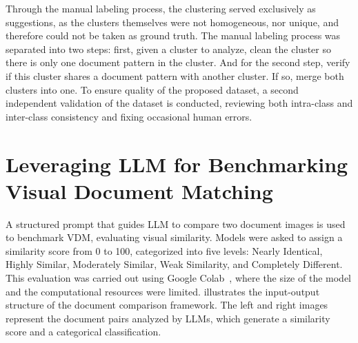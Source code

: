 Through the manual labeling process, the clustering served exclusively as suggestions, as the clusters themselves were not homogeneous, nor unique, and therefore could not be taken as ground truth. The manual labeling process was separated into two steps: first, given a cluster to analyze, clean the cluster so there is only one document pattern in the cluster. And for the second step, verify if this cluster shares a document pattern with another cluster. If so, merge both clusters into one. To ensure quality of the proposed dataset, a second independent validation of the dataset is conducted, reviewing both intra-class and inter-class consistency and fixing occasional human errors.

\section{Leveraging LLM for Benchmarking Visual Document Matching}
\label{sec:method_benchmark}

A structured prompt that guides \gls{LLM} to compare two document images is used to benchmark \gls{VDM}, evaluating visual similarity. Models were asked to assign a similarity score from 0 to 100, categorized into five levels: Nearly Identical, Highly Similar, Moderately Similar, Weak Similarity, and Completely Different. This evaluation was carried out using Google Colab~\cite{research_google_2024}, where the size of the model and the computational resources were limited.  illustrates the input-output structure of the document comparison framework. The left and right images represent the document pairs analyzed by \glspl{LLM}, which generate a similarity score and a categorical classification.

